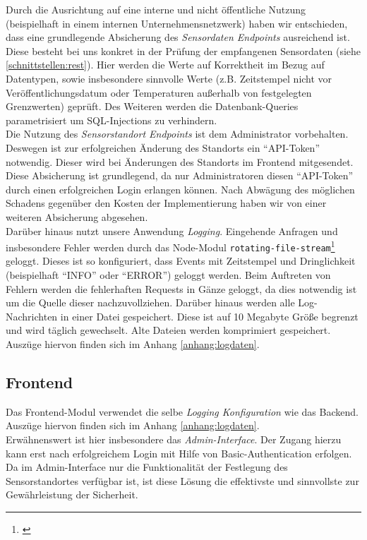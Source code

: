 Durch die Ausrichtung auf eine interne und nicht öffentliche Nutzung (beispielhaft in einem internen Unternehmensnetzwerk) haben wir entschieden, dass eine grundlegende Absicherung des \textit{Sensordaten Endpoints} ausreichend ist.
Diese besteht bei uns konkret in der Prüfung der empfangenen Sensordaten (siehe \cref{schnittstellen:rest}). Hier werden die Werte auf Korrektheit im Bezug auf Datentypen, sowie insbesondere sinnvolle Werte (z.B. Zeitstempel nicht vor Veröffentlichungsdatum oder Temperaturen außerhalb von festgelegten Grenzwerten) geprüft.
Des Weiteren werden die Datenbank-Queries parametrisiert um SQL-Injections zu verhindern.\\
Die Nutzung des \textit{Sensorstandort Endpoints} ist dem Administrator vorbehalten.
Deswegen ist zur erfolgreichen Änderung des Standorts ein \enquote{API-Token} notwendig.
Dieser wird bei Änderungen des Standorts im Frontend mitgesendet.
Diese Absicherung ist grundlegend, da nur Administratoren diesen \enquote{API-Token} durch einen erfolgreichen Login erlangen können.
Nach Abwägung des möglichen Schadens gegenüber den Kosten der Implementierung haben wir von einer weiteren Absicherung abgesehen.\\
Darüber hinaus nutzt unsere Anwendung \textit{Logging}.
Eingehende Anfragen und insbesondere Fehler werden durch das Node-Modul \texttt{rotating-file-stream}\footnote{\cite{rfs}} geloggt.
Dieses ist so konfiguriert, dass Events mit Zeitstempel und Dringlichkeit (beispielhaft \enquote{INFO} oder \enquote{ERROR}) geloggt werden.
Beim Auftreten von Fehlern werden die fehlerhaften Requests in Gänze geloggt, da dies notwendig ist um die Quelle dieser nachzuvollziehen.
Darüber hinaus werden alle Log-Nachrichten in einer Datei gespeichert.
Diese ist auf 10 Megabyte Größe begrenzt und wird täglich gewechselt.
Alte Dateien werden komprimiert gespeichert.
Auszüge hiervon finden sich im Anhang \ref{anhang:logdaten}.

\subsection{Frontend}

Das Frontend-Modul verwendet die selbe \textit{Logging Konfiguration} wie das Backend.
Auszüge hiervon finden sich im Anhang \ref{anhang:logdaten}.\\
Erwähnenswert ist hier insbesondere das \textit{Admin-Interface}.
Der Zugang hierzu kann erst nach erfolgreichem Login mit Hilfe von Basic-Authentication erfolgen.
Da im Admin-Interface nur die Funktionalität der Festlegung des Sensorstandortes verfügbar ist, ist diese Lösung die effektivste und sinnvollste zur Gewährleistung der Sicherheit.

